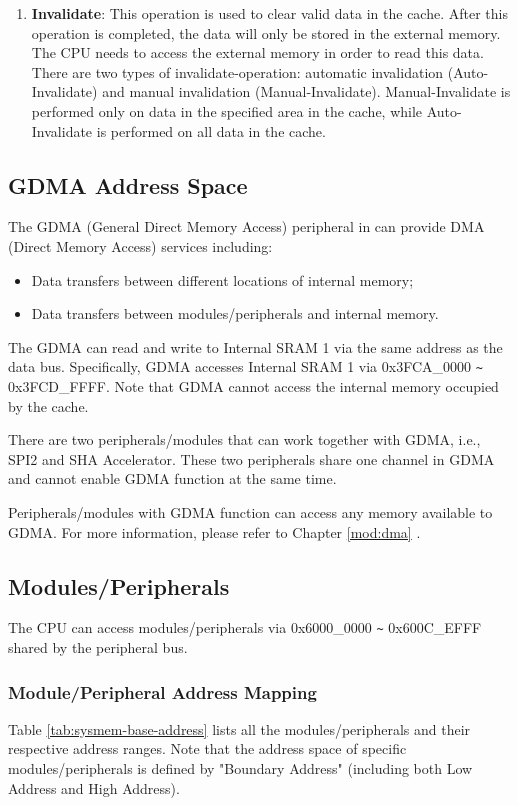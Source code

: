 \documentclass[main\_\_EN.tex]{subfiles}
\begin{document}
\begin{enumerate}
\item \textbf{Invalidate}: This operation is used to clear valid data in the cache. After this operation is completed, the data will only be stored in the external memory. The CPU needs to access the external memory in order to read this data. There are two types of invalidate-operation: automatic invalidation (Auto-Invalidate) and manual invalidation (Manual-Invalidate). Manual-Invalidate is performed only on data in the specified area in the cache, while Auto-Invalidate is performed on all data in the cache.

\end{enumerate}



\subsection{GDMA Address Space}

The GDMA (General Direct Memory Access) peripheral in \chipname{} can provide DMA (Direct Memory Access) services including:

\begin{itemize}
    \item Data transfers between different locations of internal memory;
    \item Data transfers between modules/peripherals and internal memory.
\end{itemize}


The GDMA can read and write to Internal SRAM 1 via the same address as the data bus. Specifically, GDMA accesses Internal SRAM 1 via 0x3FCA\_0000 \verb+~+ 0x3FCD\_FFFF. Note that GDMA cannot access the internal memory occupied by the cache.


There are two peripherals/modules that can work together with GDMA, i.e., SPI2 and SHA Accelerator. These two peripherals share one channel in GDMA and cannot enable GDMA function at the same time.


Peripherals/modules with GDMA function can access any memory available to GDMA. For more information, please refer to Chapter \ref{mod:dma} \textit{}.


\subsection{Modules/Peripherals}

The CPU can access modules/peripherals via 0x6000\_0000 \verb+~+ 0x600C\_EFFF shared by the peripheral bus.


\subsubsection{Module/Peripheral Address Mapping}

Table \ref{tab:sysmem-base-address} lists all the modules/peripherals and their respective address ranges. Note that the address space of specific modules/peripherals is defined by "Boundary Address" (including both Low Address and High Address).


\end{document}

